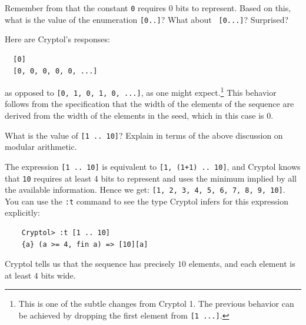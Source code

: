 \begin{Exercise}\label{ex:arith:9}
  Remember from  that the
  constant {\tt 0} requires 0 bits to represent. Based on this, what
  is the value of the enumeration {\tt [0..]}? What about {\tt
    [0...]}? Surprised?
\end{Exercise}
\begin{Answer}
Here are Cryptol's responses:\indModular\indEnum\indInfSeq
\begin{Verbatim}
  [0]
  [0, 0, 0, 0, 0, ...]
\end{Verbatim}
as opposed to \texttt{[0, 1, 0, 1, 0, ...]}, as one might
expect.\footnote{This is one of the subtle changes from Cryptol 1. The
  previous behavior can be achieved by dropping the first element from
  \texttt{[1 ...]}.}  This behavior follows from the specification that
the width of the elements of the sequence are derived from the width of
the elements in the seed, which in this case is 0.
\end{Answer}

\begin{Exercise}\label{ex:arith:10}
  What is the value of \texttt{[1 ..\ 10]}? Explain in terms of the above
  discussion on modular arithmetic.\indModular
\end{Exercise}
\begin{Answer}
  The expression \texttt{[1 ..\ 10]} is equivalent to \texttt{[1, (1+1) ..\ 10]},
  and Cryptol knows that \texttt{10} requires at least 4 bits
  to represent and uses the minimum implied by all the available
  information. Hence we get: \texttt{[1, 2, 3, 4, 5, 6, 7, 8, 9, 10]}.
  You can use the \texttt{:t} command to see the type Cryptol infers for
  this expression explicitly:
\begin{Verbatim}
    Cryptol> :t [1 .. 10]
    {a} (a >= 4, fin a) => [10][a]
\end{Verbatim}
Cryptol tells us that the sequence has precisely $10$ elements, and each
element is at least $4$ bits wide.
\end{Answer}


